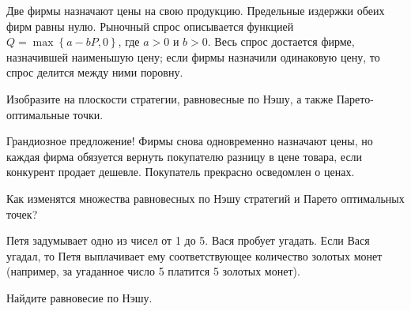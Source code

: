 \begin{problem}
Две фирмы назначают цены на свою продукцию. Предельные издержки обеих фирм равны нулю. Рыночный спрос описывается функцией  $Q=\max \left\{a-bP,0\right\}$, где  $a>0$  и  $b>0$. Весь спрос достается фирме, назначившей наименьшую цену; если фирмы назначили одинаковую цену, то спрос делится между ними поровну.\par
Изобразите на плоскости стратегии, равновесные по Нэшу, а также Парето-оптимальные точки.



\begin{sol}

\end{sol}
\end{problem}



\begin{problem}\par
Грандиозное предложение! Фирмы снова одновременно назначают цены, но каждая фирма обязуется вернуть покупателю разницу в цене товара, если конкурент продает дешевле. Покупатель прекрасно осведомлен о ценах.\par
	Как изменятся множества равновесных по Нэшу стратегий и Парето оптимальных точек?



\begin{sol}

\end{sol}
\end{problem}



\begin{problem}

Петя задумывает одно из чисел от 1 до 5. Вася пробует угадать. Если Вася угадал, то Петя выплачивает ему соответствующее количество золотых монет (например, за угаданное число 5 платится 5 золотых монет). \par
Найдите равновесие по Нэшу.

\begin{sol}

\end{sol}
\end{problem}



